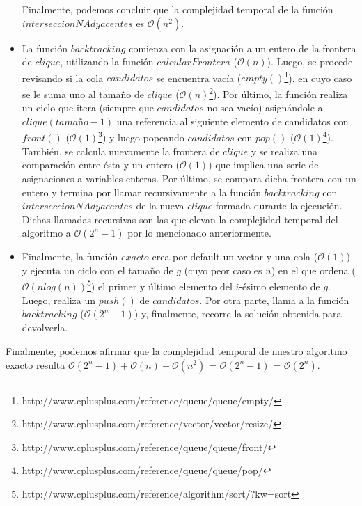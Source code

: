 \begin{itemize}
\newline
Finalmente, podemos concluir que la complejidad temporal de la función $interseccionNAdyacentes$ es $\mathcal{O}(n^2)$.
\item La función $backtracking$ comienza con la asignación a un entero de la frontera de $clique$, utilizando la función $calcularFrontera$ ($\mathcal{O}(n)$).\newline
\newline
Luego, se procede revisando si la cola $candidatos$ se encuentra vacía ($empty()$\footnote{http://www.cplusplus.com/reference/queue/queue/empty/}), en cuyo caso se le suma uno al tamaño de $clique$ ($\mathcal{O}(n)$\footnote{http://www.cplusplus.com/reference/vector/vector/resize/}).\newline
\newline
Por último, la función realiza un ciclo que itera (siempre que $candidatos$ no sea vacío) asignándole a $clique(tamaño-1)$ una referencia al siguiente elemento de candidatos con $front()$ ($\mathcal{O}(1)$\footnote{http://www.cplusplus.com/reference/queue/queue/front/}) y luego popeando $candidatos$ con $pop()$ ($\mathcal{O}(1)$\footnote{http://www.cplusplus.com/reference/queue/queue/pop/}). También, se calcula nuevamente la frontera de $clique$ y se realiza una comparación entre ésta y un entero ($\mathcal{O}(1)$) que implica una serie de asignaciones a variables enteras. Por último, se compara dicha frontera con un entero y termina por llamar recursivamente a la función $backtracking$ con $interseccionNAdyacentes$ de la nueva $clique$ formada durante la ejecución. Dichas llamadas recursivas son las que elevan la complejidad temporal del algoritmo a $\mathcal{O}(2^n - 1)$ por lo mencionado anteriormente.
\item Finalmente, la función $exacto$ crea por default un vector y una cola ($\mathcal{O}(1)$) y ejecuta un ciclo con el tamaño de $g$ (cuyo peor caso es $n$) en el que ordena ($\mathcal{O}(nlog(n))$\footnote{http://www.cplusplus.com/reference/algorithm/sort/?kw=sort})
el primer y último elemento del $i$-ésimo elemento de $g$. Luego, realiza un $push()$ de $candidatos$.\newline
\newline
Por otra parte, llama a la función $backtracking$ ($\mathcal{O}(2^n - 1)$) y, finalmente, recorre la solución obtenida para devolverla.
\end{itemize}

Finalmente, podemos afirmar que la complejidad temporal de nuestro algoritmo exacto resulta $\mathcal{O}(2^n - 1) + \mathcal{O}(n) + \mathcal{O}(n^2)$ = $\mathcal{O}(2^n - 1)$ = $\mathcal{O}(2^n)$.

